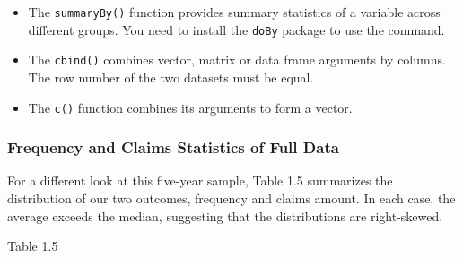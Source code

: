 \documentclass[]{book}
\theoremstyle{definition}
\theoremstyle{definition}
\theoremstyle{definition}
\theoremstyle{remark}
\begin{document}
\begin{itemize}
\item
  The \texttt{summaryBy()} function provides summary statistics of a
  variable across different groups. You need to install the
  \texttt{doBy} package to use the command.
\item
  The \texttt{cbind()} combines vector, matrix or data frame arguments
  by columns. The row number of the two datasets must be equal.
\item
  The \texttt{c()} function combines its arguments to form a vector.
\end{itemize}

\subsubsection{Frequency and Claims Statistics of Full
Data}\label{frequency-and-claims-statistics-of-full-data}

For a different look at this five-year sample, Table 1.5 summarizes the
distribution of our two outcomes, frequency and claims amount. In each
case, the average exceeds the median, suggesting that the distributions
are right-skewed.

Table 1.5
\end{document}
